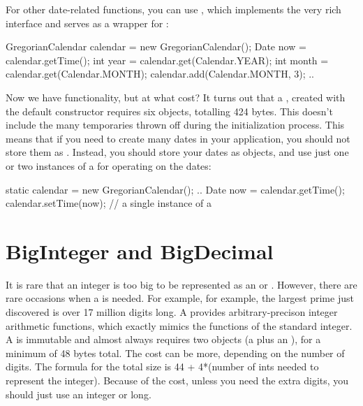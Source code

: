 For other date-related functions, you can use 
, which implements the very rich 
interface and serves as a wrapper for :
\begin{shortlisting}

	GregorianCalendar calendar = new GregorianCalendar();
    Date now = calendar.getTime();
    int year       = calendar.get(Calendar.YEAR);
	int month      = calendar.get(Calendar.MONTH); 
	calendar.add(Calendar.MONTH, 3); 
	..
    
\end{shortlisting}

Now we have functionality, but at what cost? It turns out that a
, created with the default constructor requires six
objects, totalling 424 bytes. This doesn't include the many temporaries
thrown off during the initialization process. This means that if you need to
create many dates in your application, you should not store them as
. Instead, you should store your dates as 
objects, and use just one or two instances of a  for
operating on the dates:

\begin{shortlisting}
     static calendar = new GregorianCalendar();
     ..
	 Date now = calendar.getTime();
	 calendar.setTime(now);   // a single instance of a 
\end{shortlisting}

\section{BigInteger and BigDecimal}

It is rare that an integer is too big to be represented as an  or
. However, there are rare occasions when a   is
needed. For example, for example, the largest prime
just discovered is over 17 million digits long.
A  provides 
arbitrary-precison integer arithmetic functions, which exactly mimics the
functions of the standard integer. 
A  is immutable and almost always requires two objects (a
 plus an ), for a minimum of 48 bytes total.  The
cost can be more, depending on the number of digits.  The formula for the total size is 
44 + 4*(number of ints needed to represent the integer). 
Because of the cost, unless you need the extra digits, you should just use an integer or long.

